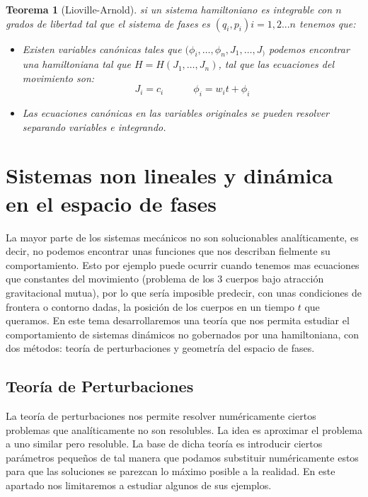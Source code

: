 \documentclass[12pt,a4paper]{article}
\numberwithin{equation}{section}
\numberwithin{figure}{section}
\newcommand{\tquad}{\quad \quad \quad}
\newtheorem{theorem}{Teorema}[section]
\begin{document}
\begin{theorem}[Lioville-Arnold]
si un sistema hamiltoniano es integrable con $n$ grados de libertad tal que el sistema de fases es $(q_i,p_i) i = 1,2...n$ tenemos que:
\begin{itemize}
\item Existen variables canónicas tales que $(\phi_i,\ldots,\phi_n,J_1,\ldots,J_)$ podemos encontrar una hamiltoniana tal que $H=H(J_1,\ldots,J_n)$, tal que las ecuaciones del movimiento son:
\begin{equation}
J_i = c_i \tquad \phi_i = w_i t + \phi_i
\end{equation}
\item Las ecuaciones canónicas en las variables originales se pueden resolver separando variables e integrando.
\end{itemize}
\end{theorem}


\newpage

\section{Sistemas non lineales y dinámica en el espacio de fases}

La mayor parte de los sistemas mecánicos no son solucionables analíticamente, es decir, no podemos encontrar unas funciones que nos describan fielmente su comportamiento. Esto por ejemplo puede ocurrir cuando tenemos mas ecuaciones que constantes del movimiento (problema de los 3 cuerpos bajo atracción gravitacional mutua), por lo que sería imposible predecir, con unas condiciones de frontera o contorno dadas, la posición de los cuerpos en un tiempo $t$ que queramos. En este tema desarrollaremos una teoría que nos permita estudiar el comportamiento de sistemas dinámicos no gobernados por una hamiltoniana, con dos métodos: teoría de perturbaciones y geometría del espacio de fases. 

\subsection{Teoría de Perturbaciones}

La teoría de perturbaciones nos permite resolver numéricamente ciertos problemas que analíticamente no son resolubles. La idea es aproximar el problema a uno similar pero resoluble. La base de dicha teoría es introducir ciertos parámetros pequeños de tal manera que podamos substituir numéricamente estos para que las soluciones se parezcan lo máximo posible a la realidad. En este apartado nos limitaremos a estudiar algunos de sus ejemplos.
\end{document}
